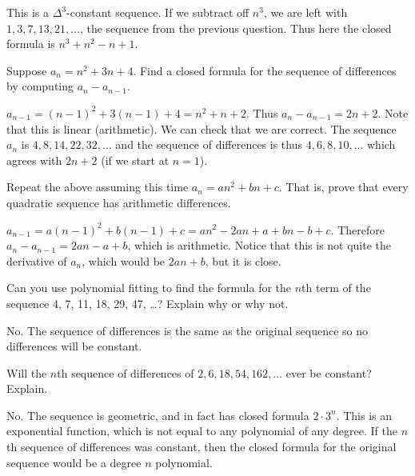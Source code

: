 \begin{questions}
	\begin{answer}
	 This is a $\Delta^3$-constant sequence.  If we subtract off $n^3$, we are left with $1, 3, 7, 13, 21, \ldots$, the sequence from the previous question.  Thus here the closed formula is $n^3 + n^2 - n + 1$.
	\end{answer}



\question Suppose $a_n = n^2 + 3n + 4$.  Find a closed formula for the sequence of differences by computing $a_n - a_{n-1}$.

	\begin{answer}
		$a_{n-1} = (n-1)^2 + 3(n-1) + 4 = n^2 + n + 2$.  Thus $a_n - a_{n-1} = 2n+2$.  Note that this is linear (arithmetic).  We can check that we are correct.  The sequence $a_n$ is $4, 8, 14, 22, 32, \ldots$ and the sequence of differences is thus $4, 6, 8, 10,\ldots$ which agrees with $2n+2$ (if we start at $n = 1$).
	\end{answer}


\question Repeat the above assuming this time $a_n = an^2 + bn + c$.  That is, prove that every quadratic sequence has arithmetic differences.

	\begin{answer}
		$a_{n-1} = a(n-1)^2 + b(n-1) + c = an^2 - 2an + a + bn - b + c$.  Therefore $a_n - a_{n-1} = 2an - a + b$, which is arithmetic.  Notice that this is not quite the derivative of $a_n$, which would be $2an + b$, but it is close.
	\end{answer}


\question Can you use polynomial fitting to find the formula for the $n$th term of the sequence 4, 7, 11, 18, 29, 47, \ldots?  Explain why or why not.

	\begin{answer}
		No.  The sequence of differences is the same as the original sequence so no differences will be constant.
	\end{answer}

	
\question Will the $n$th sequence of differences of $2, 6, 18, 54, 162, \ldots$ ever be constant?  Explain.

	\begin{answer}
		No.  The sequence is geometric, and in fact has closed formula $2\cdot 3^n$.  This is an exponential function, which is not equal to any polynomial of any degree.  If the $n$th sequence of differences was constant, then the closed formula for the original sequence would be a degree $n$ polynomial.
	\end{answer}





\end{questions}
